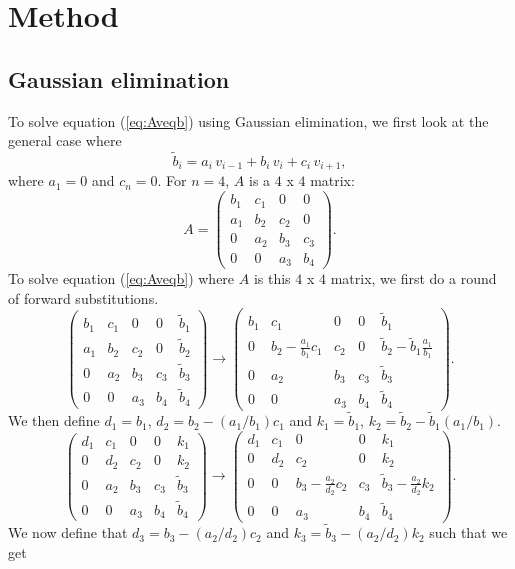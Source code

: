 \documentclass[norsk,a4paper,12pt]{article}
\begin{document}
\section{Method}
\subsection{Gaussian elimination}
To solve equation (\ref{eq:Aveqb}) using Gaussian elimination, we first look at the general case where $$\tilde{
b}_i = a_i\,v_{i-1} + b_i\,v_i + c_i\,v_{i+1},$$ where $a_1=0$ and $c_n=0$.
For $n=4$, $A$ is a $4$ x $4$ matrix:
$$A = \begin{pmatrix}
b_1&c_1&0&0\\
a_1&b_2&c_2&0\\
0&a_2&b_3&c_3\\
0&0&a_3&b_4
\end{pmatrix}.
$$
To solve equation (\ref{eq:Aveqb}) where $A$ is this $4$ x $4$ matrix, we first do a round of forward substitutions.
$$\begin{pmatrix}
b_1&c_1&0&0&\tilde{b}_1\\
a_1&b_2&c_2&0&\tilde{b}_2\\
0&a_2&b_3&c_3&\tilde{b}_3\\
0&0&a_3&b_4&\tilde{b}_4
\end{pmatrix} \rightarrow \begin{pmatrix}
b_1&c_1&0&0&\tilde{b}_1\\
0&b_2-\frac{a_1}{b_1}c_1&c_2&0&\tilde{b}_2-\tilde{b}_1\frac{a_1}{b_1}\\
0&a_2&b_3&c_3&\tilde{b}_3\\
0&0&a_3&b_4&\tilde{b}_4
\end{pmatrix}.$$
We then define $d_1=b_1$, $d_2=b_2-(a_1/b_1)c_1$ and $k_1=\tilde{b}_1$, $k_2=\tilde{b}_2-\tilde{b}_1(a_1/b_1)$. 
$$\begin{pmatrix}
d_1&c_1&0&0&k_1\\
0&d_2&c_2&0&k_2\\
0&a_2&b_3&c_3&\tilde{b}_3\\
0&0&a_3&b_4&\tilde{b}_4
\end{pmatrix} \rightarrow \begin{pmatrix}
d_1&c_1&0&0&k_1\\
0&d_2&c_2&0&k_2\\
0&0&b_3-\frac{a_2}{d_2}c_2&c_3&\tilde{b}_3-\frac{a_2}{d_2}k_2\\
0&0&a_3&b_4&\tilde{b}_4
\end{pmatrix}.$$
We now define that $d_3 = b_3-(a_2/d_2)c_2$ and $k_3=\tilde{b}_3-(a_2/d_2)k_2$ such that we get
\end{document}
